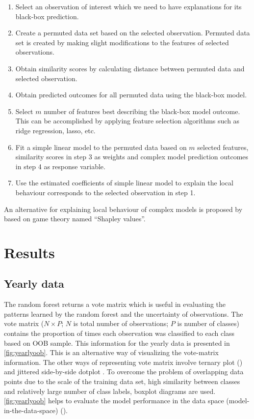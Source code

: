 \documentclass[11pt,a4paper,]{article}
\providecommand{\tightlist}{%
  \setlength{\itemsep}{0pt}\setlength{\parskip}{0pt}}
\begin{document}
\begin{enumerate}
\def\labelenumi{\arabic{enumi}.}
\tightlist
\item
  Select an observation of interest which we need to have explanations
  for its black-box prediction.
\item
  Create a permuted data set based on the selected observation. Permuted
  data set is created by making slight modifications to the features of
  selected observations.
\item
  Obtain similarity scores by calculating distance between permuted data
  and selected observation.
\item
  Obtain predicted outcomes for all permuted data using the black-box
  model.
\item
  Select \(m\) number of features best describing the black-box model
  outcome. This can be accomplished by applying feature selection
  algorithms such as ridge regression, lasso, etc.
\item
  Fit a simple linear model to the permuted data based on \(m\) selected
  features, similarity scores in step 3 as weights and complex model
  prediction outcomes in step 4 as response variable.
\item
  Use the estimated coefficients of simple linear model to explain the
  local behaviour corresponds to the selected observation in step 1.
\end{enumerate}

An alternative for explaining local behaviour of complex models is
proposed by \textcite{lundberg2017unified} based on game theory named
``Shapley values''.

\section{Results}\label{results}

\subsection{Yearly data}\label{yearly-data}

The random forest returns a vote matrix which is useful in evaluating
the patterns learned by the random forest and the uncertainty of
observations. The vote matrix (\(N \times P\); \(N\) is total number of
observations; \(P\) is number of classes) contains the proportion of
times each observation was classified to each class based on OOB sample.
This information for the yearly data is presented in
\autoref{fig:yearlyoob}. This is an alternative way of visualizing the
vote-matrix information. The other ways of representing vote matrix
involve ternary plot (\textcite{sutherland2000orca}) and jittered
side-by-side dotplot
\autocites{ehrlinger2015ggrandomforests}{da2017interactive}. To overcome
the problem of overlapping data points due to the scale of the training
data set, high similarity between classes and relatively large number of
class labels, boxplot diagrams are used. \autoref{fig:yearlyoob} helps
to evaluate the model performance in the data space
(model-in-the-data-space) (\textcite{da2017interactive}).
\end{document}
